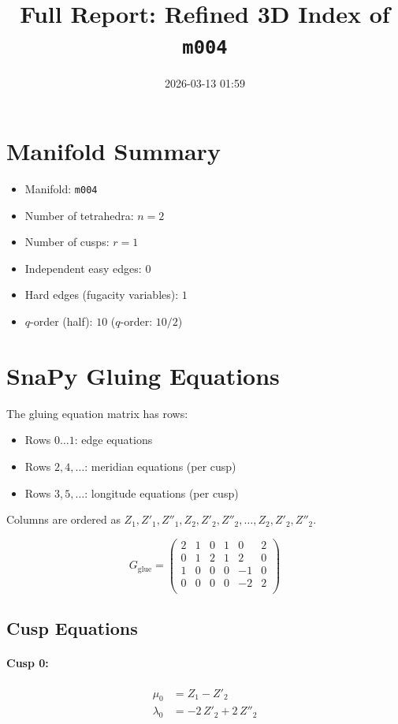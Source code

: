\documentclass[11pt,a4paper]{article}
\title{Full Report: Refined 3D Index of \texttt{m004}}
\date{2026-03-13 01:59}
\begin{document}
\maketitle
\tableofcontents
\newpage

\section{Manifold Summary}
\begin{itemize}
  \item Manifold: \texttt{m004}
  \item Number of tetrahedra: $n = 2$
  \item Number of cusps: $r = 1$
  \item Independent easy edges: $0$
  \item Hard edges (fugacity variables): $1$
  \item $q$-order (half): $10$ \quad ($q$-order: $10/2$)
\end{itemize}

\section{SnaPy Gluing Equations}
The gluing equation matrix has rows:
\begin{itemize}
  \item Rows $0\ldots1$: edge equations
  \item Rows $2,4,\ldots$: meridian equations (per cusp)
  \item Rows $3,5,\ldots$: longitude equations (per cusp)
\end{itemize}
Columns are ordered as $Z_1, Z'_1, Z''_1, Z_2, Z'_2, Z''_2, \ldots, Z_2, Z'_2, Z''_2$.

$$
G_{\text{glue}} = 
\begin{pmatrix}
2 & 1 & 0 & 1 & 0 & 2 \\
0 & 1 & 2 & 1 & 2 & 0 \\
1 & 0 & 0 & 0 & -1 & 0 \\
0 & 0 & 0 & 0 & -2 & 2 \\
\end{pmatrix}
$$
\subsection*{Cusp Equations}
\paragraph{Cusp 0:}
\begin{align*}
  \mu_0 &= Z_{1} - Z'_{2} \\
  \lambda_0 &= - 2\,Z'_{2} + 2\,Z''_{2}
\end{align*}
\end{document}
